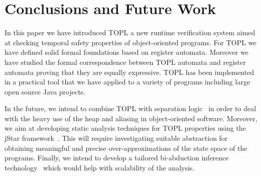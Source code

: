 \documentclass{article} %
\makeatletter
\def\grammar#1{{
  \footnotesize
  \def\b##1{{\rm\Verb@##1@}}\def\*{$^*$}\def\?{$^?$}\def\({$($}\def\){$)$}
  \def\|{$\mid$}\def\+{$^+$}
  \smallskip
  \hbox to\hsize{\hfil\vbox{\halign{\hfil\it##&$\;::=\;$\it##\hfil&\qquad\rm##\hfil\cr#1}}\hfil}
  \smallskip
}}
\theoremstyle{definition}
\theoremstyle{remark}
\makeatother
\begin{document}
\section{Conclusions and Future Work}\label{sec:conclusions} %
In this paper we have introduced TOPL a new runtime verification system aimed at checking temporal safety properties of object-oriented programs. 
For TOPL we have defined solid formal foundations based on register automata. Moreover we have studied the formal correspondence between TOPL automata and register automata proving that they are equally expressive.
TOPL has been implemented in a practical tool that we have applied  to a variety of programs including large open source Java projects.
%

In the future, we intend to combine TOPL with  separation logic~\cite{reynolds2002} in order to deal with the heavy use of the heap and aliasing in object-oriented software.
Moreover, we aim at developing static analysis techniques for TOPL properties using the jStar framework~\cite{DBLP:conf/oopsla/DistefanoP08}.
This will require investigating suitable abstraction for obtaining meaningful and precise over-approximations of the state space of the programs.
Finally, we intend to develop a tailored bi-abduction inference technology~\cite{dblp:conf/popl/CalcagnoDOY09} which would help with scalability of the analysis.



\end{document}
